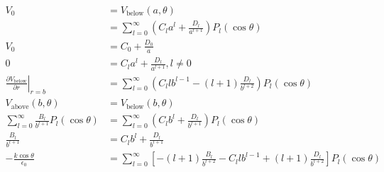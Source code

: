 \documentclass{article}
\begin{document}
\begin{enumerate}
\begin{align*}
          V_0                                                                                                                                   & = V_\text{below}(a, \theta)                                                                                                            \\
                                                                                                                                                & = \sum_{l = 0}^\infty \left( C_l a^l + \frac{D_l}{a^{l + 1}} \right) P_l(\cos \theta)                                                  \\
          V_0                                                                                                                                   & = C_0 + \frac{D_0}{a}                                                                                                                  \\
          0                                                                                                                                     & = C_l a^l + \frac{D_l}{a^{l + 1}}, l \ne 0                                                                                             \\
          \left. \frac{\partial V_\text{below}}{\partial r} \right|_{r = b}                                                                     & = \sum_{l = 0}^\infty \left( C_l l b^{l - 1} - (l + 1) \frac{D_l}{b^{l + 2}} \right) P_l(\cos \theta)                                  \\
          V_\text{above}(b, \theta)                                                                                                             & = V_\text{below}(b, \theta)                                                                                                            \\
          \sum_{l = 0}^\infty \frac{B_l}{b^{l + 1}} P_l(\cos \theta)                                                                            & = \sum_{l = 0}^\infty \left( C_l b^l + \frac{D_l}{b^{l + 1}} \right) P_l(\cos \theta)                                                  \\
          \frac{B_l}{b^{l + 1}}                                                                                                                 & = C_l b^l + \frac{D_l}{b^{l + 1}}                                                                                                      \\
          -\frac{k \cos \theta}{\epsilon_0}                                                                                                     & = \sum_{l = 0}^\infty \left[ -(l + 1) \frac{B_l}{b^{l + 2}} - C_l l b^{l - 1} + (l + 1) \frac{D_l}{b^{l + 2}} \right] P_l(\cos \theta) \\

\end{align*}
\end{enumerate}
\end{document}
